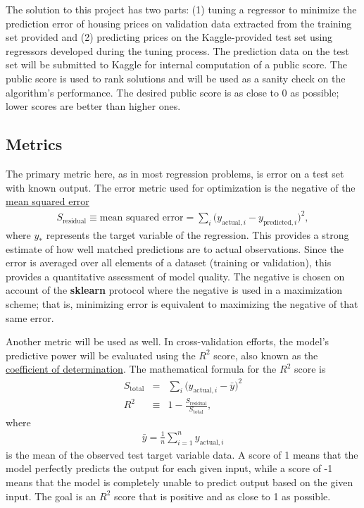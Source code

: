 \documentclass[12pt]{article}
\newcommand\beq{\begin{eqnarray*}}
\newcommand\eeq{\end{eqnarray*}}
\theoremstyle{plain} %
\theoremstyle{definition} %
\theoremstyle{remark} %
\begin{document}
\par The solution to this project has two parts:  (1) tuning a regressor to minimize the prediction error of housing prices on validation data extracted from the training set provided and (2) predicting prices on the Kaggle-provided test set using regressors developed during the tuning process.  The prediction data on the test set will be submitted to Kaggle for internal computation of a public score.  The public score is used to rank solutions and will be used as a sanity check on the algorithm's performance.  The desired public score is as close to 0 as possible; lower scores are better than higher ones.

\subsection*{Metrics}
\indent \par The primary metric here, as in most regression problems, is error on a test set with known output.  The error metric used for optimization is the negative of the \href{https://en.wikipedia.org/wiki/Mean_squared_error}{mean squared error}
\beq
S_{\text{residual}} \equiv \text{mean squared error} = \sum_i \bigl ( y_{\text{actual},i} - y_{\text{predicted},i} \bigr )^2,
\eeq
where $y_*$ represents the target variable of the regression.  This provides a strong estimate of how well matched predictions are to actual observations.  Since the error is averaged over all elements of a dataset (training or validation), this provides a quantitative assessment of model quality. The negative is chosen on account of the \textbf{sklearn} protocol where the negative is used in a maximization scheme; that is, minimizing error is equivalent to maximizing the negative of that same error.  

\par Another metric will be used as well.  In cross-validation efforts, the model's predictive power will be evaluated using the $R^2$ score, also known as the \href{http://stattrek.com/statistics/dictionary.aspx?definition=coefficient_of_determination}{coefficient of determination}.  The mathematical formula for the $R^2$ score is
\beq
S_{\text{total}} &=& \sum_i \bigl ( y_{\text{actual},i} - \bar y \bigr )^2 \\
R^2 &\equiv& 1 - \frac{S_{\text{residual}}}{S_{\text{total}}},
\eeq
where 
\beq
\bar y = \frac{1}{n} \sum_{i=1}^n y_{\text{actual},i}
\eeq
is the mean of the observed test target variable data.  A score of 1 means that the model perfectly predicts the output for each given input, while a score of -1 means that the model is completely unable to predict output based on the given input.  The goal is an $R^2$ score that is positive and as close to 1 as possible.
\end{document}
